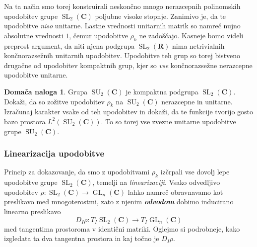 \documentclass[11pt]{book}
\def\RR{\mathbf{R}}
\def\CC{\mathbf{C}}
\DeclareMathOperator\SU{SU}
\DeclareMathOperator\GL{GL}
\DeclareMathOperator\SL{SL}
\def\definicija{\color{rdeca}\bf\em}
\theoremstyle{definition}
\theoremstyle{zgled}
\theoremstyle{odprtproblem}
\theoremstyle{domacanaloga}
\newtheorem*{domacanaloga}{Domača naloga}
\theoremstyle{izrek}
\begin{document}
Na ta način smo torej konstruirali neskončno mnogo nerazcepnih polinomskih upodobitev grupe $\SL_2(\CC)$ poljubne visoke stopnje. Zanimivo je, da te upodobitve \emph{niso} unitarne. Lastne vrednosti unitarnih matrik so namreč nujno absolutne vrednosti $1$, čemur upodobitve $\rho_k$ ne zadoščajo. Kasneje bomo videli preprost argument, da niti njena podgrupa $\SL_2(\RR)$ nima netrivialnih končnorazsežnih unitarnih upodobitev. Upodobitve teh grup so torej bistveno drugačne od upodobitev kompaktnih grup, kjer so \emph{vse} končnorazsežne nerazcepne upodobitve unitarne.

\begin{domacanaloga}
Grupa $\SU_2(\CC)$ je kompaktna podgrupa $\SL_2(\CC)$. Dokaži, da so zožitve upodobitev $\rho_k$ na $\SU_2(\CC)$ nerazcepne in unitarne. Izračunaj karakter vsake od teh upodobitev in dokaži, da te funkcije tvorijo gosto bazo prostora $L^2(\SU_2(\CC))$. To so torej vse zvezne unitarne upodobitve grupe $\SU_2(\CC)$.
\end{domacanaloga}

\subsubsection{Linearizacija upodobitve}

Princip za dokazovanje, da smo z upodobitvami $\rho_k$ izčrpali vse dovolj lepe upodobitve grupe $\SL_2(\CC)$, temelji na \emph{linearizaciji}. Vsako odvedljivo upodobitev $\rho \colon \SL_2(\CC) \to \GL_n(\CC)$ lahko namreč obravnavamo kot preslikavo med mnogoterostmi, zato z njenim {\definicija odvodom} dobimo inducirano linearno preslikavo
\[
    \textstyle D_I \rho \colon T_I \SL_2(\CC) \to T_I \GL_n(\CC)
\]
med tangentima prostoroma v identični matriki. Oglejmo si podrobneje, kako izgledata ta dva tangentna prostora in kaj točno je $D_I \rho$.
\end{document}
